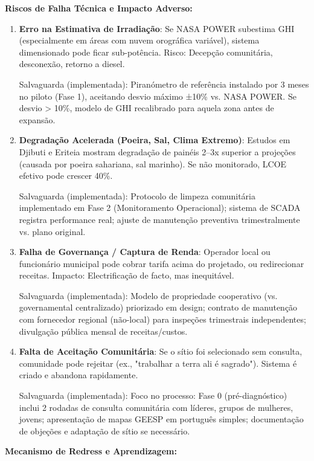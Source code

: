 \documentclass[12pt, a4paper]{article}
\begin{document}
\textbf{Riscos de Falha Técnica e Impacto Adverso:}

\begin{enumerate}
\item \textbf{Erro na Estimativa de Irradiação}: Se NASA POWER subestima GHI (especialmente em áreas com nuvem orográfica variável), sistema dimensionado pode ficar sub-potência. Risco: Decepção comunitária, desconexão, retorno a diesel.
  
  Salvaguarda (implementada): Piranómetro de referência instalado por 3 meses no piloto (Fase 1), aceitando desvio máximo ±10\% vs. NASA POWER. Se desvio > 10\%, modelo de GHI recalibrado para aquela zona antes de expansão.

\item \textbf{Degradação Acelerada (Poeira, Sal, Clima Extremo)}: Estudos em Djibuti e Eriteia mostram degradação de painéis 2--3x superior a projeções (causada por poeira sahariana, sal marinho). Se não monitorado, LCOE efetivo pode crescer 40\%.
  
  Salvaguarda (implementada): Protocolo de limpeza comunitária implementado em Fase 2 (Monitoramento Operacional); sistema de SCADA registra performance real; ajuste de manutenção preventiva trimestralmente vs. plano original.

\item \textbf{Falha de Governança / Captura de Renda}: Operador local ou funcionário municipal pode cobrar tarifa acima do projetado, ou redirecionar receitas. Impacto: Electrificação de facto, mas inequitável.
  
  Salvaguarda (implementada): Modelo de propriedade cooperativo (vs. governamental centralizado) priorizado em design; contrato de manutenção com fornecedor regional (não-local) para inspeções trimestrais independentes; divulgação pública mensal de receitas/custos.

\item \textbf{Falta de Aceitação Comunitária}: Se o sítio foi selecionado sem consulta, comunidade pode rejeitar (ex., "trabalhar a terra ali é sagrado"). Sistema é criado e abandona rapidamente.
  
  Salvaguarda (implementada): Foco no processo: Fase 0 (pré-diagnóstico) inclui 2 rodadas de consulta comunitária com líderes, grupos de mulheres, jovens; apresentação de mapas GEESP em português simples; documentação de objeções e adaptação de sítio se necessário.
\end{enumerate}

\textbf{Mecanismo de Redress e Aprendizagem:}
\end{document}
